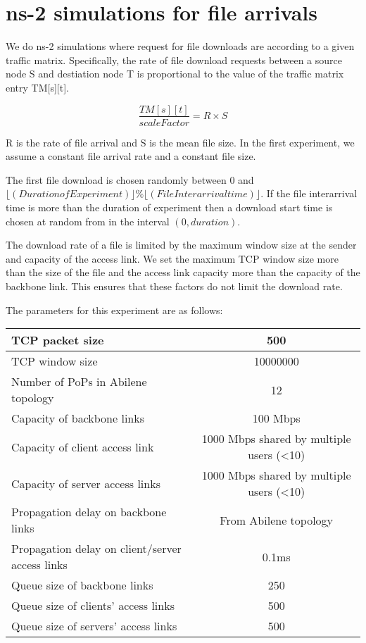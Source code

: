 \section{ns-2 simulations for file arrivals}

We do ns-2 simulations where request for file downloads are according to a given traffic matrix. Specifically, the rate of file download requests between a source node S and destiation node T is proportional to the value of the traffic matrix entry TM[s][t].

\[\frac{TM[s][t]}{scaleFactor} = R\times S\]

R is the rate of file arrival and S is the mean file size. In the first experiment, we assume a constant file arrival rate and a constant file size.

The first file download is chosen randomly between 0 and $\lfloor (Duration of Experiment)\rfloor\%\lfloor(File Inter arrival time)\rfloor$. If the file interarrival time is more than the duration of experiment then a download start time is chosen at random from in the interval $(0,duration)$.

The download rate of a file is limited by the maximum window size at the sender and capacity of the access link. We set the maximum TCP window size more than the size of the file and the access link capacity more than the capacity of the backbone link. This ensures that these factors do not limit the download rate.

The parameters for this experiment are as follows:

\begin{center}
  \begin{tabular}{| l | c | }
    \hline
TCP packet size & 500\\ \hline
TCP window size & 10000000\\ \hline
Number of PoPs in Abilene topology & 12\\ \hline
Capacity of backbone links & 100 Mbps\\ \hline
Capacity of client access link & 1000 Mbps shared by multiple users (<10) \\ \hline
Capacity of server access links & 1000 Mbps shared by multiple users (<10) \\ \hline
Propagation delay on backbone links & From Abilene topology\\ \hline
Propagation delay on client/server access links & 0.1ms\\ \hline
Queue size of backbone links & 250\\ \hline
Queue size of clients' access links & 500\\ \hline
Queue size of servers' access links & 500\\ \hline
    \hline
  \end{tabular}
\end{center}

